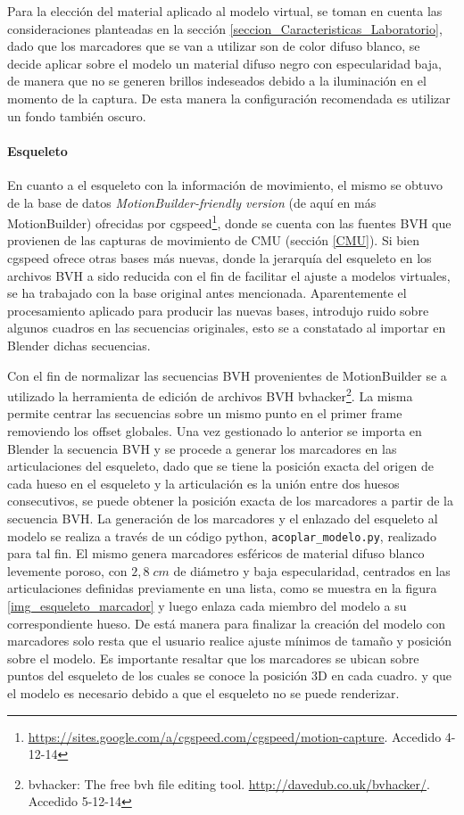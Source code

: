 Para la elección del material aplicado al modelo virtual, se toman en cuenta las consideraciones planteadas en la sección \ref{seccion_Caracteristicas_Laboratorio}, dado que los marcadores que se van a utilizar son de color difuso blanco, se decide aplicar sobre el modelo un material difuso negro con especularidad baja, de manera que no se generen brillos indeseados debido a la iluminación en el momento de la captura. De esta manera la configuración recomendada es utilizar un fondo también oscuro.

\paragraph{Esqueleto}
En cuanto a el esqueleto con la información de movimiento, el mismo se obtuvo de la base de datos \textit{MotionBuilder-friendly version} (de aquí en más MotionBuilder) ofrecidas por cgspeed\footnote{\textcolor{blue}{\underline{\url{https://sites.google.com/a/cgspeed.com/cgspeed/motion-capture}}}. Accedido 4-12-14},
 donde se cuenta con las fuentes BVH que provienen de las capturas de movimiento de CMU (sección \ref{CMU}). Si bien cgspeed ofrece otras bases más nuevas, donde la jerarquía del esqueleto en los archivos BVH a sido reducida con el fin de facilitar el ajuste a modelos virtuales, se ha trabajado con la base original antes mencionada. Aparentemente el procesamiento aplicado para producir las nuevas bases, introdujo ruido sobre algunos cuadros en las secuencias originales, esto se a constatado al importar en Blender dichas secuencias.
      
 Con el fin de normalizar las secuencias BVH provenientes de MotionBuilder se a utilizado la herramienta de edición de archivos BVH bvhacker\footnote{bvhacker: The free bvh file editing tool. \textcolor{blue}{\underline{\url{ http://davedub.co.uk/bvhacker/}}}. Accedido 5-12-14}. La misma permite centrar las secuencias sobre un mismo punto en el primer frame  removiendo los offset globales.
 Una vez gestionado lo anterior se importa en Blender la secuencia BVH y se procede a generar los marcadores en las articulaciones del esqueleto, dado que se tiene la posición exacta del origen de cada hueso en el esqueleto y la articulación es la unión entre dos huesos consecutivos, se puede obtener la posición exacta de los marcadores a partir de la secuencia BVH.
 La generación de los marcadores y el enlazado del esqueleto al modelo se realiza a través de un código python, \texttt{acoplar\_modelo.py}, realizado para tal fin. El mismo genera marcadores esféricos de material difuso blanco levemente poroso, con $2,8 \;cm$ de diámetro y baja especularidad, centrados en las articulaciones definidas previamente en una lista, como se muestra en la figura \ref{img_esqueleto_marcador} y luego enlaza cada miembro del modelo a su correspondiente hueso. De está manera para finalizar la creación del modelo con marcadores solo resta que el usuario realice ajuste mínimos de tamaño y posición sobre el modelo. Es importante resaltar que los marcadores se ubican sobre puntos del esqueleto de los cuales se conoce la posición 3D en cada cuadro. y que el modelo es necesario debido a que el esqueleto no se puede renderizar. 
 
